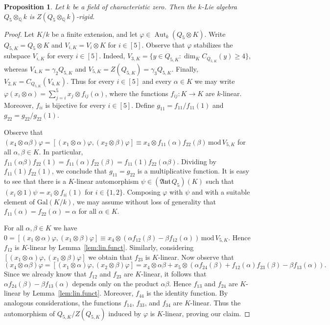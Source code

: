 \documentclass[11pt,a4paper]{amsart}
\theoremstyle{plain}
\newtheorem{pro}[thm]{Proposition}
\theoremstyle{remark}
\newcommand{\Q}{\mathbb{Q}}
\newcommand{\tensor}{\otimes}
\DeclareMathOperator{\Aut}{Aut}
\def \aAut {\mathfrak{Aut} \,}
\begin{document}
\begin{pro}
Let $k$ be a field of characteristic zero.  Then the $k$-Lie algebra $Q_5 \tensor_\Q k$ is $Z(Q_5 \tensor_\Q k)$-rigid.
\end{pro}
\begin{proof}
Let $K/k$ be a finite extension, and let $\varphi \in \Aut_k(Q_5 \tensor K)$.  Write $Q_{5,K} = Q_5 \tensor K$ and $V_{i,K} = V_i \tensor K$ for $i \in [5]$.  Observe that $\varphi$ stabilizes the subspace $V_{i,K}$ for every $i \in [5]$.  Indeed, $V_{3,K} = \{ y \in Q_{5,K} : \dim_K C_{Q_{5,K}}(y) \geq 4 \}$, whereas $V_{4,K} = \gamma_2 Q_{5,K}$ and $V_{5,K} = Z(Q_{5,K}) = \gamma_3 Q_{5,K}$.  Finally, $V_{2,K} = C_{Q_{5,K}}(V_{4,K})$.  Thus for every $i \in [5]$ and every $\alpha \in K$ we may write $\varphi(x_i \tensor \alpha) = \sum_{j = i}^5 x_j \tensor f_{ij}(\alpha)$, where the functions $f_{ij} : K \to K$ are $k$-linear.  Moreover, $f_{ii}$ is bijective for every $i \in [5]$.  Define $g_{11} = f_{11} / f_{11}(1)$ and $g_{22} = g_{22}/g_{22}(1)$.

Observe that $(x_4 \tensor \alpha \beta)\varphi = [(x_1 \tensor \alpha)\varphi, (x_2 \tensor \beta)\varphi] \equiv x_4 \tensor f_{11}(\alpha) f_{22}(\beta) \, \mathrm{mod} \, V_{5,K}$ for all $\alpha, \beta \in K$.  In particular, $f_{11}(\alpha \beta) f_{22}(1) = f_{11}(\alpha) f_{22}(\beta) = f_{11}(1) f_{22}(\alpha \beta)$.  Dividing by $f_{11}(1)f_{22}(1)$, we conclude that $g_{11} = g_{22}$ is a multiplicative function.  It is easy to see that there is a $K$-linear automorphism $\psi \in (\aAut Q_5)(K)$ such that $(x_i \tensor 1)\psi = x_i \tensor f_{ii}(1)$ for $i \in \{1, 2 \}$.  Composing $\varphi$ with $\psi$ and with a suitable element of $\mathrm{Gal}(K/k)$, we may assume without loss of generality that $f_{11}(\alpha) = f_{22}(\alpha) = \alpha$ for all $\alpha \in K$.

For all $\alpha, \beta \in K$ we have $0 = [(x_1 \tensor \alpha)\varphi, (x_1 \tensor \beta)\varphi] \equiv x_4 \tensor (\alpha f_{12}(\beta) - \beta f_{12}(\alpha)) \, \mathrm{mod} \, V_{5,K}$.  Hence $f_{12}$ is $K$-linear by Lemma~\ref{lem:lin.funct}.  Similarly, considering $[(x_1 \tensor \alpha)\varphi, (x_1 \tensor \beta)\varphi]$ we obtain that $f_{23}$ is $K$-linear.  Now observe that
$$ (x_4 \tensor \alpha \beta)\varphi = [(x_1 \tensor \alpha)\varphi,(x_2 \tensor \beta)\varphi] = x_4 \tensor \alpha\beta + x_5 \tensor (\alpha f_{24}(\beta) + f_{12}(\alpha)f_{23}(\beta) - \beta f_{13}(\alpha)).$$
Since we already know that $f_{12}$ and $f_{23}$ are $K$-linear, it follows that $\alpha f_{24}(\beta) - \beta f_{13}(\alpha)$ depends only on the product $\alpha\beta$.  Hence $f_{13}$ and $f_{24}$ are $K$-linear by Lemma~\ref{lem:lin.funct}.  Moreover, $f_{44}$ is the identity function.  By analogous considerations, the functions $f_{14}$, $f_{33}$, and $f_{34}$ are $K$-linear.  Thus the automorphism of $Q_{5,K}/Z(Q_{5,K})$ induced by $\varphi$ is $K$-linear, proving our claim.
\end{proof}
\end{document}
